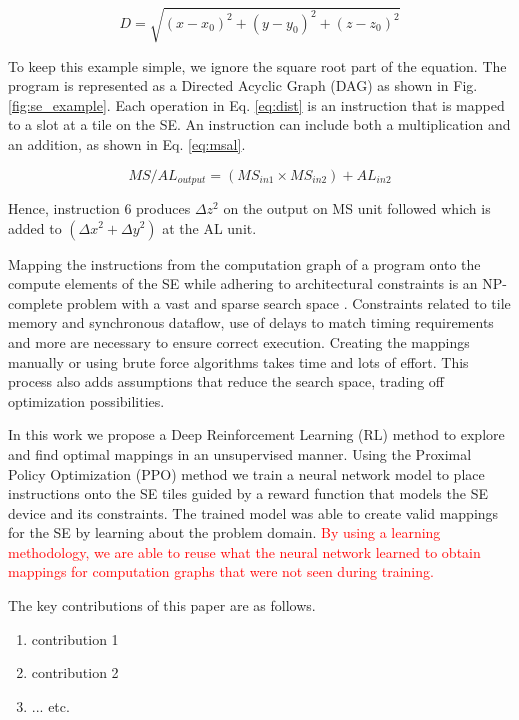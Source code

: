 \begin{equation}
    \label{eq:dist}
    D = \sqrt{(x - x_0)^2 +(y - y_0)^2 + (z - z_0)^2}
\end{equation}

To keep this example simple, we ignore the square root part of the equation.
The program is represented as a Directed Acyclic Graph (DAG) as shown in Fig. \ref{fig:se_example}.
Each operation in Eq. \ref{eq:dist} is an instruction that is mapped to a slot at a tile on the SE.
An instruction can include both a multiplication and an addition, as shown in Eq. \ref{eq:msal}.

\begin{equation}
    \label{eq:msal}
    MS/AL_{output} = (MS_{in1} \times MS_{in2}) + AL_{in2} 
\end{equation}

Hence, instruction 6 produces $\Delta z^2$ on the output on MS unit followed which is added to $(\Delta x^2 + \Delta y^2)$ at the AL unit.


Mapping the instructions from the computation graph of a program onto the compute elements of the SE while adhering to architectural constraints is an NP-complete problem with a vast and sparse search space \cite{10.1007/3-540-69346-7_30}. 
Constraints related to tile memory and synchronous dataflow, use of delays to match timing requirements and more are necessary to ensure correct execution. 
Creating the mappings manually or using brute force algorithms takes time and lots of effort. 
This process also adds assumptions that reduce the search space, trading off optimization possibilities.  

In this work we propose a Deep Reinforcement Learning (RL) method to explore and find optimal mappings in an unsupervised manner. 
Using the Proximal Policy Optimization (PPO) method we train a neural network model to place instructions onto the SE tiles guided by a reward function that models the SE device and its constraints. 
The trained model was able to create valid mappings for the SE by learning about the problem domain. 
\textcolor{red}{By using a learning methodology, we are able to reuse what the neural network learned to obtain mappings for computation graphs that were not seen during training.}  


The key contributions of this paper are as follows.
\begin{enumerate}
    \item contribution 1
    \item contribution 2
    \item ... etc.
\end{enumerate}



